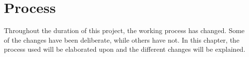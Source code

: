 \chapter{Process}
Throughout the duration of this project, the working process has changed.
Some of the changes have been deliberate, while others have not.
In this chapter, the process used will be elaborated upon and the different changes will be explained.

